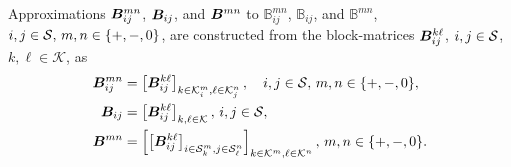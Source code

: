 Approximations \( \boldsymbol B^{mn}_{ij}\), \( \boldsymbol B_{ij}\), and \( \boldsymbol B^{mn}\) to \(\mathbb B^{mn}_{ij}\), \(\mathbb B_{ij}\), and \(\mathbb B^{mn}\), \(i,j\in\mathcal{S},\,m,n\in\{+,-,0\}\), are constructed from the block-matrices \({  \boldsymbol B}^{k\ell}_{ij}\), \(i,j\in\mathcal{S}\), \(k,\ell\in\mathcal K\), as
\begin{align*}
	{  \boldsymbol B}_{ij}^{m n} &= \left[{  \boldsymbol B}_{ij}^{k \ell}\right]_{k\in\mathcal K_i^m,\ell\in\mathcal K_j^n},\quad i,j\in\mathcal{S},\,m,n\in\{+,-,0\},
\\	{  \boldsymbol B}_{ij} &= \left[{  \boldsymbol B}_{ij}^{k\ell}\right]_{k,\ell\in\mathcal K},\,{i,j\in\mathcal{S}},
\\	{  \boldsymbol B}^{m n} &= \left[\left[{  \boldsymbol B}_{ij}^{k\ell}\right]_{i\in\mathcal{S}_k^m,j\in\mathcal{S}_\ell^n}\right]_{k\in\mathcal K^m,\ell\in\mathcal K^n},\,m,n\in\{+,-,0\}.
\end{align*}

